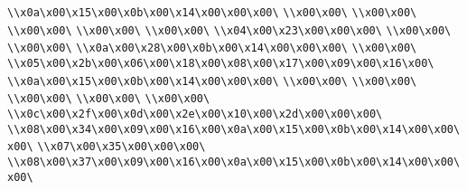 \verb|\\x0a\x00\x15\x00\x0b\x00\x14\x00\x00\x00\|\newline
\verb|\\x00\x00\|\newline
\verb|\\x00\x00\|\newline
\verb|\\x00\x00\|\newline
\verb|\\x00\x00\|\newline
\verb|\\x00\x00\|\newline
\verb|\\x04\x00\x23\x00\x00\x00\|\newline
\verb|\\x00\x00\|\newline
\verb|\\x00\x00\|\newline
\verb|\\x0a\x00\x28\x00\x0b\x00\x14\x00\x00\x00\|\newline
\verb|\\x00\x00\|\newline
\verb|\\x05\x00\x2b\x00\x06\x00\x18\x00\x08\x00\x17\x00\x09\x00\x16\x00\|\newline
\verb|\\x0a\x00\x15\x00\x0b\x00\x14\x00\x00\x00\|\newline
\verb|\\x00\x00\|\newline
\verb|\\x00\x00\|\newline
\verb|\\x00\x00\|\newline
\verb|\\x00\x00\|\newline
\verb|\\x00\x00\|\newline
\verb|\\x0c\x00\x2f\x00\x0d\x00\x2e\x00\x10\x00\x2d\x00\x00\x00\|\newline
\verb|\\x08\x00\x34\x00\x09\x00\x16\x00\x0a\x00\x15\x00\x0b\x00\x14\x00\x00\x00\|\newline
\verb|\\x07\x00\x35\x00\x00\x00\|\newline
\verb|\\x08\x00\x37\x00\x09\x00\x16\x00\x0a\x00\x15\x00\x0b\x00\x14\x00\x00\x00\|\newline
